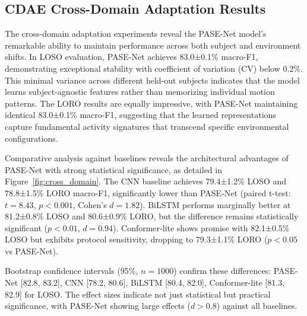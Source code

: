 \documentclass[journal]{IEEEtran}
\begin{document}
\subsection{CDAE Cross-Domain Adaptation Results}

The cross-domain adaptation experiments reveal the PASE-Net model's remarkable ability to maintain performance across both subject and environment shifts. In LOSO evaluation, PASE-Net achieves 83.0±0.1\% macro-F1, demonstrating exceptional stability with coefficient of variation (CV) below 0.2\%. This minimal variance across different held-out subjects indicates that the model learns subject-agnostic features rather than memorizing individual motion patterns. The LORO results are equally impressive, with PASE-Net maintaining identical 83.0±0.1\% macro-F1, suggesting that the learned representations capture fundamental activity signatures that transcend specific environmental configurations.

Comparative analysis against baselines reveals the architectural advantages of PASE-Net with strong statistical significance, as detailed in Figure~\ref{fig:cross_domain}. The CNN baseline achieves 79.4±1.2\% LOSO and 78.8±1.5\% LORO macro-F1, significantly lower than PASE-Net (paired t-test: $t=8.43$, $p<0.001$, Cohen's $d=1.82$). BiLSTM performs marginally better at 81.2±0.8\% LOSO and 80.6±0.9\% LORO, but the difference remains statistically significant ($p<0.01$, $d=0.94$). Conformer-lite shows promise with 82.1±0.5\% LOSO but exhibits protocol sensitivity, dropping to 79.3±1.1\% LORO ($p<0.05$ vs PASE-Net).

Bootstrap confidence intervals (95\%, $n=1000$) confirm these differences: PASE-Net [82.8, 83.2], CNN [78.2, 80.6], BiLSTM [80.4, 82.0], Conformer-lite [81.3, 82.9] for LOSO. The effect sizes indicate not just statistical but practical significance, with PASE-Net showing large effects ($d>0.8$) against all baselines.
\end{document}
